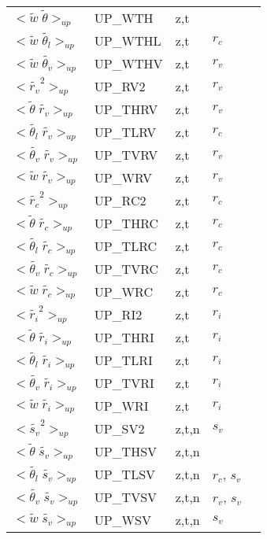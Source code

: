 \begin{center}
\begin{makeimage}
\begin{tabular}{||p{6cm}|>{\centering}p{2.5cm}|>{\centering}p{1.5cm}|>{\centering}p{0.9cm}|p{4.1cm }||}
\cline{1-4}
$<{\tilde{w}\;\tilde{\theta}}>_{up}$ & UP\_WTH & z,t & & \\
\cline{1-4}
$<{\tilde{w}\;\tilde{\theta_l}}>_{up}$ & UP\_WTHL & z,t & $r_c$ & \\
\cline{1-4}
$<{\tilde{w}\;\tilde{\theta_v}}>_{up}$ & UP\_WTHV & z,t & $r_v$ & \\
\cline{1-4}
$<{\tilde{r_v}}^2>_{up}$ & UP\_RV2 & z,t & $r_v$ & \\
\cline{1-4}
$<{\tilde{\theta}\;\tilde{r_v}}>_{up}$ & UP\_THRV & z,t & $r_v$ & \\
\cline{1-4}
$<{\tilde{\theta_l}\;\tilde{r_v}}>_{up}$ & UP\_TLRV & z,t & $r_c$ & \\
\cline{1-4}
$<{\tilde{\theta_v}\;\tilde{r_v}}>_{up}$ & UP\_TVRV & z,t & $r_v$ & \\
\cline{1-4}
$<{\tilde{w}\;\tilde{r_v}}>_{up}$ & UP\_WRV & z,t & $r_v$ & \\
\cline{1-4}
$<{\tilde{r_c}}^2>_{up}$ & UP\_RC2 & z,t & $r_c$ & \\
\cline{1-4}
$<{\tilde{\theta}\;\tilde{r_c}}>_{up}$ & UP\_THRC & z,t & $r_c$ & \\
\cline{1-4}
$<{\tilde{\theta_l}\;\tilde{r_c}}>_{up}$ & UP\_TLRC & z,t & $r_c$ & \\
\cline{1-4}
$<{\tilde{\theta_v}\;\tilde{r_c}}>_{up}$ & UP\_TVRC & z,t & $r_c$ & \\
\cline{1-4}
$<{\tilde{w}\;\tilde{r_c}}>_{up}$ & UP\_WRC & z,t & $r_c$ & \\
\cline{1-4}
$<{\tilde{r_i}}^2>_{up}$ & UP\_RI2 & z,t & $r_i$ & \\
\cline{1-4}
$<{\tilde{\theta}\;\tilde{r_i}}>_{up}$ & UP\_THRI & z,t & $r_i$ & \\
\cline{1-4}
$<{\tilde{\theta_l}\;\tilde{r_i}}>_{up}$ & UP\_TLRI & z,t & $r_i$ & \\
\cline{1-4}
$<{\tilde{\theta_v}\;\tilde{r_i}}>_{up}$ & UP\_TVRI & z,t & $r_i$ & \\
\cline{1-4}
$<{\tilde{w}\;\tilde{r_i}}>_{up}$ & UP\_WRI & z,t & $r_i$ & \\
\cline{1-4}
$<{\tilde{s_v}}^2>_{up}$ & UP\_SV2 & z,t,n & $s_v$ & \\
\cline{1-4}
$<{\tilde{\theta}\;\tilde{s_v}}>_{up}$ & UP\_THSV & z,t,n & & \\
\cline{1-4}
$<{\tilde{\theta_l}\;\tilde{s_v}}>_{up}$ & UP\_TLSV & z,t,n & $r_c$, $s_v$ & \\
\cline{1-4}
$<{\tilde{\theta_v}\;\tilde{s_v}}>_{up}$& UP\_TVSV & z,t,n & $r_v$, $s_v$ & \\
\cline{1-4}
$<{\tilde{w}\;\tilde{s_v}}>_{up}$ & UP\_WSV & z,t,n & $s_v$ & \\
\hline
\hline
\end{tabular}
\end{makeimage}
\end{center}

